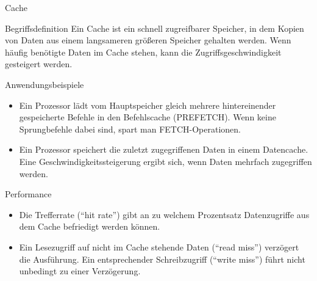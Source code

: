 \documentclass[utf8,9pt]{beamer}
\begin{document}
\begin{frame}{Cache}{}
\begin{block}{Begriffsdefinition}
Ein Cache ist ein schnell zugreifbarer Speicher, in dem Kopien von Daten
aus einem langsameren größeren Speicher gehalten werden. Wenn häufig benötigte
Daten im Cache stehen, kann die Zugriffsgeschwindigkeit gesteigert werden.  
\end{block}

\begin{block}{Anwendungsbeispiele}

\begin{itemize}
\item Ein Prozessor lädt vom Hauptspeicher gleich mehrere hintereinender
   gespeicherte Befehle in den Befehlscache (PREFETCH). Wenn keine Sprungbefehle dabei
   sind, spart man FETCH-Operationen.
\item Ein Prozessor speichert die zuletzt zugegriffenen Daten in einem
   Datencache. Eine Geschwindigkeitssteigerung ergibt sich, wenn Daten mehrfach zugegriffen werden.
\end{itemize}
\end{block}


\begin{block}{Performance}
\begin{itemize} 
\item 
Die Trefferrate ("`hit rate"') gibt an zu welchem Prozentsatz Datenzugriffe aus dem Cache  befriedigt werden können. 
\item Ein Lesezugriff auf nicht im Cache stehende Daten ("`read miss"')
   verzögert die Ausführung. Ein entsprechender Schreibzugriff   ("`write miss"')
   führt nicht unbedingt zu einer Verzögerung.
 \end{itemize}
\end{block}

\end{frame}
\end{document}
